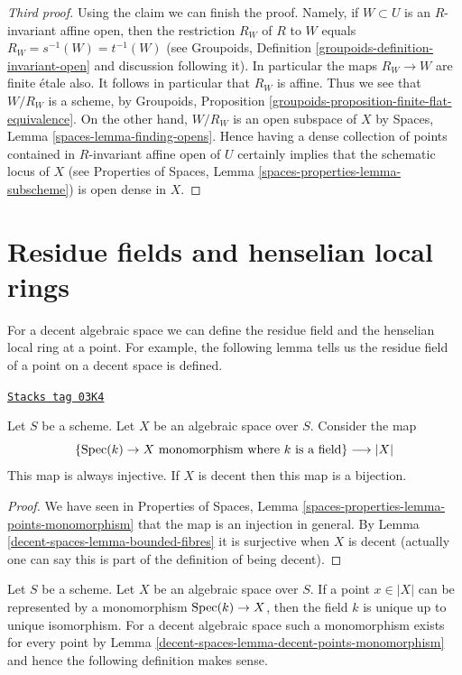\begin{proof}[Third proof]
\medskip\noindent
Using the claim we can finish the proof. Namely, if $W \subset U$ is
an $R$-invariant affine open, then the restriction $R_W$ of $R$ to $W$
equals $R_W = s^{-1}(W) = t^{-1}(W)$ (see
Groupoids, Definition \ref{groupoids-definition-invariant-open}
and discussion following it). In particular the maps $R_W \to W$ are
finite \'etale also. It follows in particular that $R_W$ is affine.
Thus we see that $W/R_W$ is a scheme, by
Groupoids, Proposition \ref{groupoids-proposition-finite-flat-equivalence}.
On the other hand, $W/R_W$ is an open subspace of $X$ by
Spaces, Lemma \ref{spaces-lemma-finding-opens}.
Hence having a dense collection of points contained in $R$-invariant
affine open of $U$ certainly implies that the schematic locus of $X$
(see Properties of Spaces, Lemma \ref{spaces-properties-lemma-subscheme})
is open dense in $X$.
\end{proof}

\section{Residue fields and henselian local rings}
\label{decent-spaces-section-residue-fields-henselian-local-rings}
For a decent algebraic space we can define the residue field and the
henselian local ring at a point. For example, the following lemma
tells us the residue field of a point on a decent space is defined.

\begin{lemma}
\label{decent-spaces-lemma-decent-points-monomorphism}
\href{https://stacks.math.columbia.edu/tag/03K4}{\texttt{Stacks tag 03K4}}

Let $S$ be a scheme. Let $X$ be an algebraic space over $S$.
Consider the map
$$
\{\operatorname{Spec}(k) \to X \text{ monomorphism where }k\text{ is a field}\}
\longrightarrow
|X|
$$
This map is always injective. If $X$ is decent then this map
is a bijection.
\end{lemma}

\begin{proof}
We have seen in
Properties of Spaces,
Lemma \ref{spaces-properties-lemma-points-monomorphism}
that the map is an injection in general.
By Lemma \ref{decent-spaces-lemma-bounded-fibres} it is surjective when $X$ is
decent (actually one can say this is part of the definition
of being decent).
\end{proof}

Let $S$ be a scheme. Let $X$ be an algebraic space over $S$.
If a point $x \in |X|$ can be represented by a monomorphism
$\operatorname{Spec}(k) \to X$, then the field $k$ is unique up to unique
isomorphism. For a decent
algebraic space such a monomorphism exists for every point
by Lemma \ref{decent-spaces-lemma-decent-points-monomorphism}
and hence the following definition makes sense.

